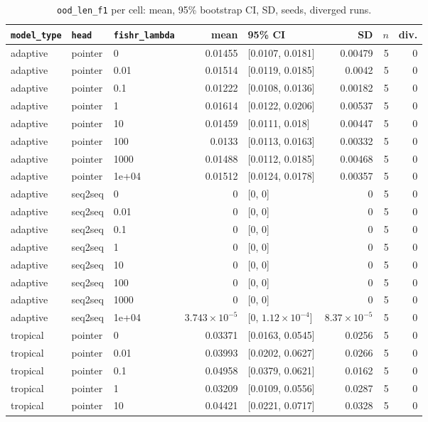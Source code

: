 \documentclass[10pt]{article}
\begin{document}
{\small
\begin{longtable}{lllrlrrr}
\caption{\texttt{ood\_len\_f1} per cell: mean, 95\% bootstrap CI, SD, seeds, diverged runs.}\label{tab:summary-ood_len_f1}\\
\toprule
\texttt{model\_type} & \texttt{head} & \texttt{fishr\_lambda} & mean & 95\% CI & SD & $n$ & div.\\
\midrule
\endhead
adaptive & pointer & 0 & 0.01455 & [0.0107, 0.0181] & 0.00479 & 5 & 0\\
adaptive & pointer & 0.01 & 0.01514 & [0.0119, 0.0185] & 0.0042 & 5 & 0\\
adaptive & pointer & 0.1 & 0.01222 & [0.0108, 0.0136] & 0.00182 & 5 & 0\\
adaptive & pointer & 1 & 0.01614 & [0.0122, 0.0206] & 0.00537 & 5 & 0\\
adaptive & pointer & 10 & 0.01459 & [0.0111, 0.018] & 0.00447 & 5 & 0\\
adaptive & pointer & 100 & 0.0133 & [0.0113, 0.0163] & 0.00332 & 5 & 0\\
adaptive & pointer & 1000 & 0.01488 & [0.0112, 0.0185] & 0.00468 & 5 & 0\\
adaptive & pointer & 1e+04 & 0.01512 & [0.0124, 0.0178] & 0.00357 & 5 & 0\\
adaptive & seq2seq & 0 & 0 & [0, 0] & 0 & 5 & 0\\
adaptive & seq2seq & 0.01 & 0 & [0, 0] & 0 & 5 & 0\\
adaptive & seq2seq & 0.1 & 0 & [0, 0] & 0 & 5 & 0\\
adaptive & seq2seq & 1 & 0 & [0, 0] & 0 & 5 & 0\\
adaptive & seq2seq & 10 & 0 & [0, 0] & 0 & 5 & 0\\
adaptive & seq2seq & 100 & 0 & [0, 0] & 0 & 5 & 0\\
adaptive & seq2seq & 1000 & 0 & [0, 0] & 0 & 5 & 0\\
adaptive & seq2seq & 1e+04 & $3.743\times10^{-5}$ & [0, $1.12\times10^{-4}$] & $8.37\times10^{-5}$ & 5 & 0\\
tropical & pointer & 0 & 0.03371 & [0.0163, 0.0545] & 0.0256 & 5 & 0\\
tropical & pointer & 0.01 & 0.03993 & [0.0202, 0.0627] & 0.0266 & 5 & 0\\
tropical & pointer & 0.1 & 0.04958 & [0.0379, 0.0621] & 0.0162 & 5 & 0\\
tropical & pointer & 1 & 0.03209 & [0.0109, 0.0556] & 0.0287 & 5 & 0\\
tropical & pointer & 10 & 0.04421 & [0.0221, 0.0717] & 0.0328 & 5 & 0\\

\end{longtable}}
\end{document}
